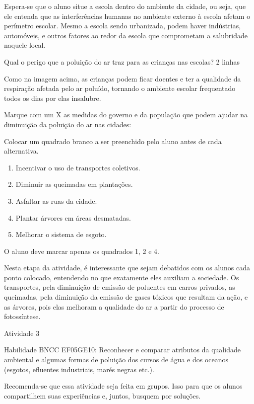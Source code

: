 Espera-se que o aluno situe a escola dentro do ambiente da cidade, ou
seja, que ele entenda que as interferências humanas no ambiente externo
à escola afetam o perímetro escolar. Mesmo a escola sendo urbanizada,
podem haver indústrias, automóveis, e outros fatores ao redor da escola
que comprometam a salubridade naquele local.

Qual o perigo que a poluição do ar traz para as crianças nas escolas? 2
linhas

Como na imagem acima, as crianças podem ficar doentes e ter a qualidade
da respiração afetada pelo ar poluído, tornando o ambiente escolar
frequentado todos os dias por elas insalubre.

Marque com um X as medidas do governo e da população que podem ajudar na
diminuição da poluição do ar nas cidades:

Colocar um quadrado branco a ser preenchido pelo aluno antes de cada
alternativa.

\begin{enumerate}
\def\labelenumi{\arabic{enumi}.}
\item
  Incentivar o uso de transportes coletivos.
\item
  Diminuir as queimadas em plantações.
\item
  Asfaltar as ruas da cidade.
\item
  Plantar árvores em áreas desmatadas.
\item
  Melhorar o sistema de esgoto.
\end{enumerate}

O aluno deve marcar apenas os quadrados 1, 2 e 4.

Nesta etapa da atividade, é interessante que sejam debatidos com os
alunos cada ponto colocado, entendendo no que exatamente eles auxiliam a
sociedade. Os transportes, pela diminuição de emissão de poluentes em
carros privados, as queimadas, pela diminuição da emissão de gases
tóxicos que resultam da ação, e as árvores, pois elas melhoram a
qualidade do ar a partir do processo de fotossíntese.

Atividade 3

Habilidade BNCC EF05GE10: Reconhecer e comparar atributos da qualidade
ambiental e algumas formas de poluição dos cursos de água e dos oceanos
(esgotos, efluentes industriais, marés negras etc.).

Recomenda-se que essa atividade seja feita em grupos. Isso para que os
alunos compartilhem suas experiências e, juntos, busquem por soluções.


